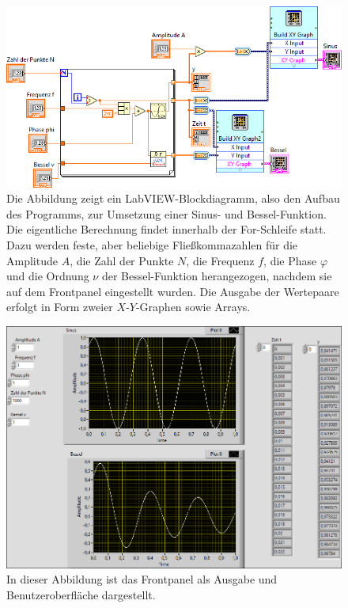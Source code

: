\documentclass[
a4paper,
12pt,
pagesize,
ngerman
]{scrartcl}
\begin{document}
	\begin{figure}[H]
		\centering
		\includegraphics[width=1.0\textwidth]{EIRE2018Dateien/Tag1/sinusbessel-bilder/SinusBesseld}
		\caption{Die Abbildung zeigt ein LabVIEW-Blockdiagramm, also den Aufbau des Programms, zur Umsetzung einer Sinus- und Bessel-Funktion. Die eigentliche Berechnung findet innerhalb der For-Schleife statt. Dazu werden feste, aber beliebige Fließkommazahlen für die Amplitude $A$, die Zahl der Punkte $N$, die Frequenz $f$, die Phase $\varphi$ und die Ordnung $\nu$ der Bessel-Funktion herangezogen, nachdem sie auf dem Frontpanel eingestellt wurden. Die Ausgabe der Wertepaare erfolgt in Form zweier $X$-$Y$-Graphen sowie Arrays.}
		\label{sinusbesselprogrammcode}
	\end{figure}

	\begin{figure}[H]
		\centering
		\includegraphics[width=1.0\textwidth]{EIRE2018Dateien/Tag1/sinusbessel-bilder/SinusBesselp}
		\caption{In dieser Abbildung ist das Frontpanel als Ausgabe und Benutzeroberfläche dargestellt.}
		\label{sinusbesselausgabe}
	\end{figure}
	
\end{document}
